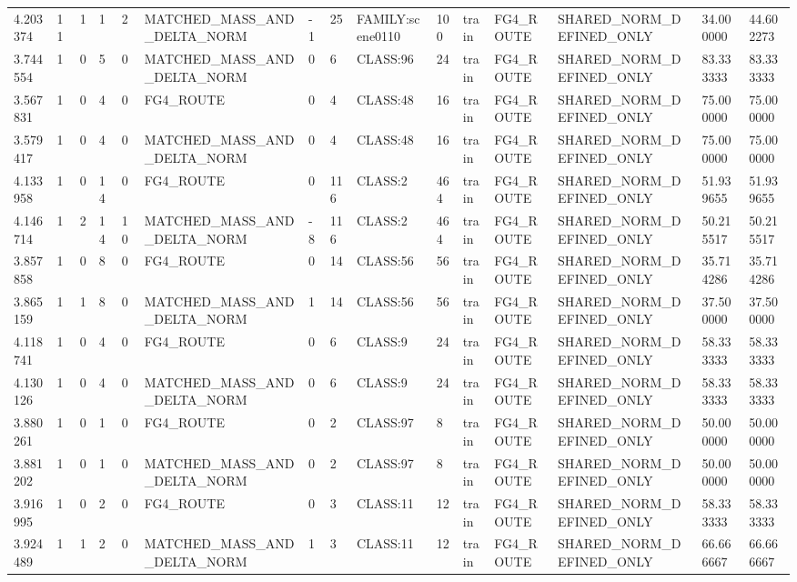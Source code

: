 \begin{tabular}{lllllllllllllll}
4.203374 & 11 & 1 & 1 & 2 & MATCHED\_MASS\_AND\_DELTA\_NORM & -1 & 25 & FAMILY:scene0110 & 100 & train & FG4\_ROUTE & SHARED\_NORM\_DEFINED\_ONLY & 34.000000 & 44.602273 \\
3.744554 & 1 & 0 & 5 & 0 & MATCHED\_MASS\_AND\_DELTA\_NORM & 0 & 6 & CLASS:96 & 24 & train & FG4\_ROUTE & SHARED\_NORM\_DEFINED\_ONLY & 83.333333 & 83.333333 \\
3.567831 & 1 & 0 & 4 & 0 & FG4\_ROUTE & 0 & 4 & CLASS:48 & 16 & train & FG4\_ROUTE & SHARED\_NORM\_DEFINED\_ONLY & 75.000000 & 75.000000 \\
3.579417 & 1 & 0 & 4 & 0 & MATCHED\_MASS\_AND\_DELTA\_NORM & 0 & 4 & CLASS:48 & 16 & train & FG4\_ROUTE & SHARED\_NORM\_DEFINED\_ONLY & 75.000000 & 75.000000 \\
4.133958 & 1 & 0 & 14 & 0 & FG4\_ROUTE & 0 & 116 & CLASS:2 & 464 & train & FG4\_ROUTE & SHARED\_NORM\_DEFINED\_ONLY & 51.939655 & 51.939655 \\
4.146714 & 1 & 2 & 14 & 10 & MATCHED\_MASS\_AND\_DELTA\_NORM & -8 & 116 & CLASS:2 & 464 & train & FG4\_ROUTE & SHARED\_NORM\_DEFINED\_ONLY & 50.215517 & 50.215517 \\
3.857858 & 1 & 0 & 8 & 0 & FG4\_ROUTE & 0 & 14 & CLASS:56 & 56 & train & FG4\_ROUTE & SHARED\_NORM\_DEFINED\_ONLY & 35.714286 & 35.714286 \\
3.865159 & 1 & 1 & 8 & 0 & MATCHED\_MASS\_AND\_DELTA\_NORM & 1 & 14 & CLASS:56 & 56 & train & FG4\_ROUTE & SHARED\_NORM\_DEFINED\_ONLY & 37.500000 & 37.500000 \\
4.118741 & 1 & 0 & 4 & 0 & FG4\_ROUTE & 0 & 6 & CLASS:9 & 24 & train & FG4\_ROUTE & SHARED\_NORM\_DEFINED\_ONLY & 58.333333 & 58.333333 \\
4.130126 & 1 & 0 & 4 & 0 & MATCHED\_MASS\_AND\_DELTA\_NORM & 0 & 6 & CLASS:9 & 24 & train & FG4\_ROUTE & SHARED\_NORM\_DEFINED\_ONLY & 58.333333 & 58.333333 \\
3.880261 & 1 & 0 & 1 & 0 & FG4\_ROUTE & 0 & 2 & CLASS:97 & 8 & train & FG4\_ROUTE & SHARED\_NORM\_DEFINED\_ONLY & 50.000000 & 50.000000 \\
3.881202 & 1 & 0 & 1 & 0 & MATCHED\_MASS\_AND\_DELTA\_NORM & 0 & 2 & CLASS:97 & 8 & train & FG4\_ROUTE & SHARED\_NORM\_DEFINED\_ONLY & 50.000000 & 50.000000 \\
3.916995 & 1 & 0 & 2 & 0 & FG4\_ROUTE & 0 & 3 & CLASS:11 & 12 & train & FG4\_ROUTE & SHARED\_NORM\_DEFINED\_ONLY & 58.333333 & 58.333333 \\
3.924489 & 1 & 1 & 2 & 0 & MATCHED\_MASS\_AND\_DELTA\_NORM & 1 & 3 & CLASS:11 & 12 & train & FG4\_ROUTE & SHARED\_NORM\_DEFINED\_ONLY & 66.666667 & 66.666667 \\

\end{tabular}
